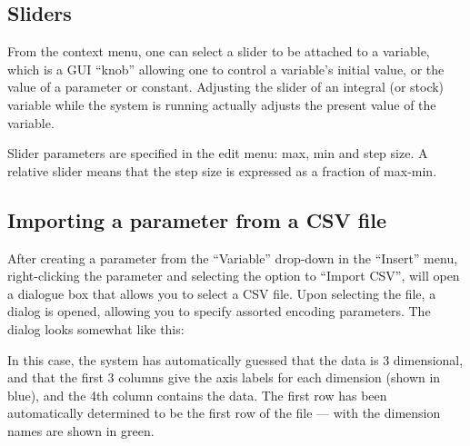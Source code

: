 \subsection{Sliders}

From the context menu, one can select a slider to be attached to a
variable, which is a GUI ``knob'' allowing one to control a variable's
initial value, or the value of a parameter or constant. Adjusting the
slider of an integral (or stock) variable while the system is running
actually adjusts the present value of the variable.

Slider parameters are specified in the edit menu: max, min and step
size. A relative slider means that the step size is expressed as a
fraction of max-min.

\subsection{Importing a parameter from a CSV file}\label{CSV
  import}

After creating a parameter from the ``Variable'' drop-down in the
``Insert'' menu, right-clicking the parameter and selecting the option
to ``Import CSV'', will open a dialogue box that allows you to select 
a CSV file. Upon selecting the file, a dialog is opened, allowing you to 
specify assorted encoding parameters. The dialog looks somewhat like this:

\begin{center}
\end{center}

In this case, the system has automatically guessed that the data is 3
dimensional, and that the first 3 columns give the axis labels for
each dimension (shown in blue), and the 4th column contains the
data. The first row has been automatically determined to be the first
row of the file --- with the dimension names are shown in green.

